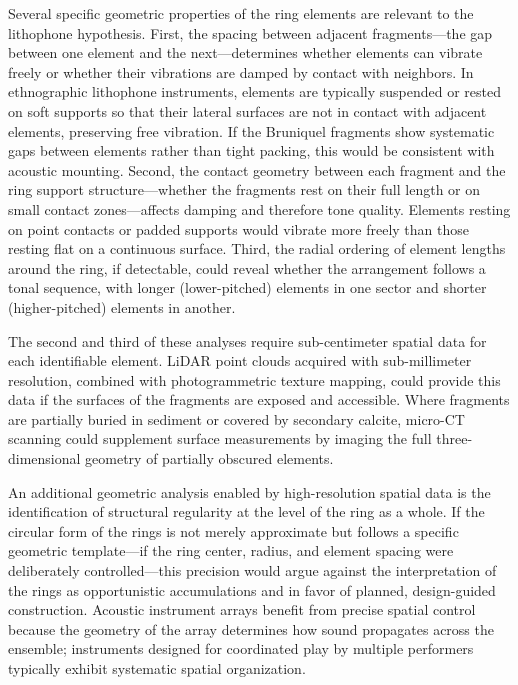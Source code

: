 \documentclass[12pt]{article}
\begin{document}
Several specific geometric properties of the ring elements are relevant to the lithophone hypothesis. First, the spacing between adjacent fragments—the gap between one element and the next—determines whether elements can vibrate freely or whether their vibrations are damped by contact with neighbors. In ethnographic lithophone instruments, elements are typically suspended or rested on soft supports so that their lateral surfaces are not in contact with adjacent elements, preserving free vibration. If the Bruniquel fragments show systematic gaps between elements rather than tight packing, this would be consistent with acoustic mounting. Second, the contact geometry between each fragment and the ring support structure—whether the fragments rest on their full length or on small contact zones—affects damping and therefore tone quality. Elements resting on point contacts or padded supports would vibrate more freely than those resting flat on a continuous surface. Third, the radial ordering of element lengths around the ring, if detectable, could reveal whether the arrangement follows a tonal sequence, with longer (lower-pitched) elements in one sector and shorter (higher-pitched) elements in another.

The second and third of these analyses require sub-centimeter spatial data for each identifiable element. LiDAR point clouds acquired with sub-millimeter resolution, combined with photogrammetric texture mapping, could provide this data if the surfaces of the fragments are exposed and accessible. Where fragments are partially buried in sediment or covered by secondary calcite, micro-CT scanning could supplement surface measurements by imaging the full three-dimensional geometry of partially obscured elements.

An additional geometric analysis enabled by high-resolution spatial data is the identification of structural regularity at the level of the ring as a whole. If the circular form of the rings is not merely approximate but follows a specific geometric template—if the ring center, radius, and element spacing were deliberately controlled—this precision would argue against the interpretation of the rings as opportunistic accumulations and in favor of planned, design-guided construction. Acoustic instrument arrays benefit from precise spatial control because the geometry of the array determines how sound propagates across the ensemble; instruments designed for coordinated play by multiple performers typically exhibit systematic spatial organization.
\end{document}
